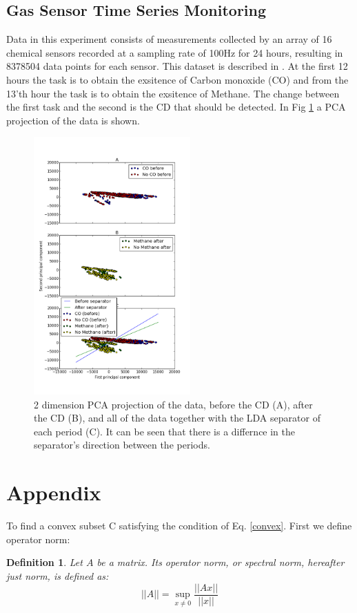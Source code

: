 \documentclass[11pt,twocolumn,varwidth=true,a4paper,fleqn]{article}
\newtheorem{definition}{Definition}
\begin{document}
\subsection{Gas Sensor Time Series Monitoring}
Data in this experiment consists of measurements collected
by an array of 16 chemical sensors recorded at a sampling
rate of 100Hz for 24 hours, resulting in 8378504 data points for each sensor. 
This dataset is described in \cite{bigGas}.
At the first 12 hours the task is to obtain the exsitence of Carbon monoxide
(CO) and from the 13'th hour the task is to obtain the exsitence of Methane. The
change between the first task and the second is the CD that should be
detected. In Fig \ref{BigGasShowData} a PCA projection of the data is shown.

\begin{figure}[h]
\centering
\includegraphics[width=60mm]{BigGas/showData.png}
\caption{2 dimension PCA projection of the data, before the CD (A),
after the CD (B), and all of the data together with the LDA separator of each
period (C). It can be seen that there is a differnce in the separator's
direction between the periods.}
\label{BigGasShowData}
\end{figure}





\clearpage
\appendix
\section{Appendix} \label{AppendixA}
To find a convex subset C satisfying the condition of Eq. \ref{convex}. 
First we define operator norm:
\begin{definition}
Let $A$ be a matrix. Its operator norm, or
spectral norm, hereafter just norm, is defined as:
\begin{equation*}
||A|| = \sup_{x \neq 0}\frac{||Ax||}{||x||} 
\end{equation*}
\end{definition}
\end{document}

